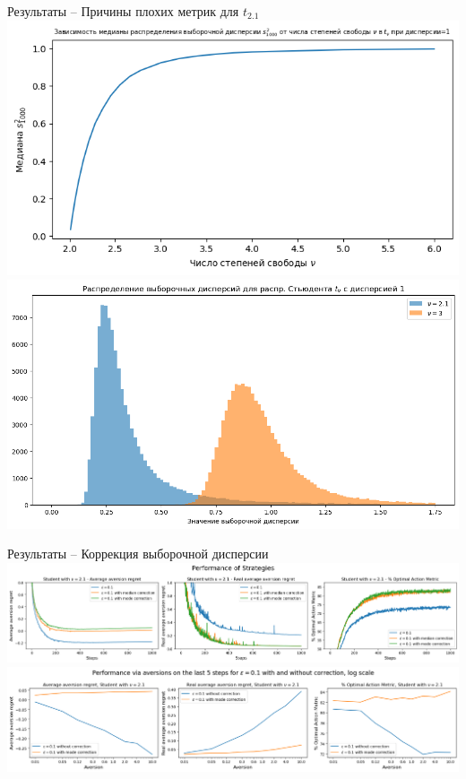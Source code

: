 \documentclass[10pt]{beamer} %
\begin{document}
\begin{frame}{Результаты -- Причины плохих метрик для $t_{2.1}$}
    \includegraphics[scale=0.35,left]{images/experiments_aversion/why_2_p_1_so_bad/dependence_median_to_df.png}
    \includegraphics[scale=0.25,right]{images/experiments_aversion/why_2_p_1_so_bad/distribution_of_sample_vars.png}
\end{frame}
\begin{frame}{Результаты -- Коррекция выборочной дисперсии}
    \includegraphics[scale=0.25,center]{images/experiments_aversion/correction/compare_outer.png}
    \includegraphics[scale=0.25,center]{images/experiments_aversion/correction/last_5_steps.png}
\end{frame}
\end{document}
